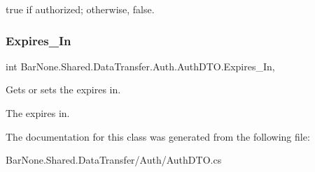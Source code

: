 {\ttfamily true} if authorized; otherwise, {\ttfamily false}. \mbox{\label{class_bar_none_1_1_shared_1_1_data_transfer_1_1_auth_1_1_auth_d_t_o_a694bc6dee1dc5e5151b29e811b1025fc}} 
\subsubsection{\texorpdfstring{Expires\+\_\+\+In}{Expires\_In}}
{\footnotesize\ttfamily int Bar\+None.\+Shared.\+Data\+Transfer.\+Auth.\+Auth\+D\+T\+O.\+Expires\+\_\+\+In\hspace{0.3cm}{\ttfamily [get]}, {\ttfamily [set]}}



Gets or sets the expires in. 

The expires in. 

The documentation for this class was generated from the following file\+:\begin{DoxyCompactItemize}
\item 
Bar\+None.\+Shared.\+Data\+Transfer/\+Auth/Auth\+D\+T\+O.\+cs\end{DoxyCompactItemize}
